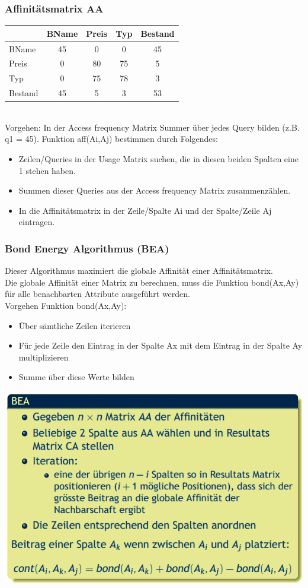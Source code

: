 \documentclass[a4paper,11pt]{article}
\begin{document}
\subsubsection{Affinitätsmatrix AA}
\begin{tabular}{|l||c|c|c|c|}
\hline
&BName&Preis&Typ&Bestand\\ \hline
BName & 45 & 0 & 0 & 45 \\ \hline
Preis & 0 & 80 & 75 & 5 \\ \hline
Typ & 0 & 75 & 78 & 3 \\ \hline
Bestand & 45 & 5 & 3 & 53 \\ \hline
\end{tabular}\\
Vorgehen: In der Access frequency Matrix Summer über jedes Query bilden (z.B. q1 = 45). Funktion aff(Ai,Aj) bestimmen durch Folgendes:
\begin{itemize}
\item Zeilen/Queries in der Usage Matrix suchen, die in diesen beiden Spalten eine 1 stehen haben.
\item Summen dieser Queries aus der Access frequency Matrix zusammenzählen.
\item In die Affinitätsmatrix in der Zeile/Spalte Ai und der Spalte/Zeile Aj eintragen.
\end{itemize}
\subsubsection{Bond Energy Algorithmus (BEA)}
Dieser Algorithmus maximiert die globale Affinität einer Affinitätsmatrix.\\
Die globale Affinität einer Matrix zu berechnen, muss die Funktion bond(Ax,Ay) für alle benachbarten Attribute ausgeführt werden.\\
Vorgehen Funktion bond(Ax,Ay):
\begin{itemize}
\item Über sämtliche Zeilen iterieren
\item Für jede Zeile den Eintrag in der Spalte Ax mit dem Eintrag in der Spalte Ay multiplizieren
\item Summe über diese Werte bilden
\end{itemize}
\includegraphics[scale=0.8]{src/bea.png}
\end{document}
